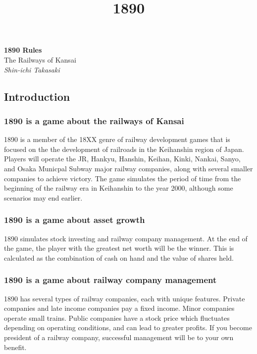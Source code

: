 \documentclass{article}
\title{1890}
\begin{document}
\begin{titlepage}
  \begin{center}
    \Huge\textbf{1890 Rules}\\
    \Large{The Railways of Kansai}\\
    \large\textit{Shin-ichi Takasaki}
  \end{center}
\end{titlepage}

\tableofcontents
\pagebreak
{}

\begin{CJK}{UTF8}{min}
\begin{multicols}{2}
\section*{Introduction}

\subsubsection*{1890 is a game about the railways of Kansai}
1890 is a member of the 18XX genre of railway development games that
is focused on the the development of railroads in the Keihanshin
region of Japan. Players will operate the JR, Hankyu, Hanshin, Keihan,
Kinki, Nankai, Sanyo, and Osaka Municpal Subway major railway
companies, along with several smaller companies to achieve
victory. The game simulates the period of time from the beginning of
the railway era in Keihanshin to the year 2000, although some
scenarios may end earlier.

\subsubsection*{1890 is a game about asset growth}
1890 simulates stock investing and railway company management. At the end
of the game, the player with the greatest net worth will be the
winner. This is calculated as the combination of cash on hand and
the value of shares held.

\subsubsection*{1890 is a game about railway company management}
1890 has several types of railway companies, each with unique
features. Private companies and late income companies pay a fixed
income. Minor companies operate small trains. Public companies have a
stock price which fluctuates depending on operating conditions, and
can lead to greater profits. If you become president of a railway
company, successful management will be to your own benefit.


\end{multicols}
\end{CJK}
\end{document}
